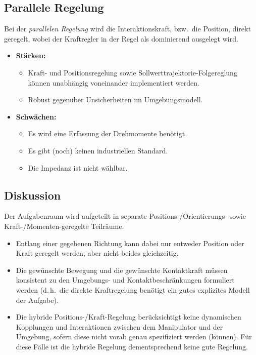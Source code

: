 \documentclass[a4paper, 11pt, accentcolor = tud3b]{tudreport}
\renewcommand{\dh}{d.\,h.~}
\newcommand{\bzw}{bzw.~}
\begin{document}
			\subsection{Parallele Regelung}
				Bei der \emph{parallelen Regelung} wird die Interaktionskraft, \bzw die Position, direkt geregelt, wobei der Kraftregler in der Regel als dominierend ausgelegt wird.
				
				\begin{itemize}
					\item \textbf{Stärken:}
						\begin{itemize}
							\item Kraft- und Positionsregelung sowie Sollwerttrajektorie-Folgereglung können unabhängig voneinander implementiert werden.
							\item Robust gegenüber Unsicherheiten im Umgebungsmodell.
						\end{itemize}
					\item \textbf{Schwächen:}
						\begin{itemize}
							\item Es wird eine Erfassung der Drehmomente benötigt.
							\item Es gibt (noch) keinen industriellen Standard.
							\item Die Impedanz ist nicht wählbar.
						\end{itemize}
				\end{itemize}
			
			\subsection{Diskussion}
				\label{sec:control_hybrid_discussion}
			
				Der Aufgabenraum wird aufgeteilt in separate Positions-/Orientierungs- sowie Kraft-/Momenten-geregelte Teilräume.
				\begin{itemize}
					\item Entlang einer gegebenen Richtung kann dabei nur entweder Position oder Kraft geregelt werden, aber nicht beides gleichzeitig.
					\item Die gewünschte Bewegung und die gewünschte Kontaktkraft müssen konsistent zu den Umgebungs- und Kontaktbeschränkungen formuliert werden (\dh die direkte Kraftregelung benötigt ein gutes explizites Modell der Aufgabe).
					\item Die hybride Positions-/Kraft-Regelung berücksichtigt keine dynamischen Kopplungen und Interaktionen zwischen dem Manipulator und der Umgebung, sofern diese nicht vorab genau spezifiziert werden (können). Für diese Fälle ist die hybride Regelung dementsprechend keine gute Regelung.
				\end{itemize}
\end{document}
